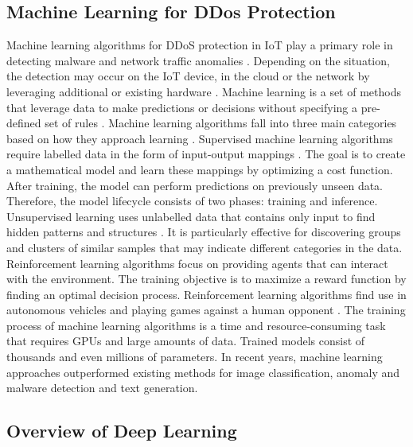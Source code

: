 \documentclass[conference, 11pt]{IEEEtran}
\begin{document}
    \subsection{Machine Learning for DDos Protection}
    Machine learning algorithms for DDoS protection in IoT play a primary role in detecting malware and network traffic anomalies \cite{article:18}.
    Depending on the situation, the detection may occur on the IoT device, in the cloud or the network by leveraging additional or existing hardware \cite{article:5}.
    Machine learning is a set of methods that leverage data to make predictions or decisions without specifying a pre-defined set of rules \cite{Goodfellow-et-al-2016}.
    Machine learning algorithms fall into three main categories based on how they approach learning \cite{article:6}.
    Supervised machine learning algorithms require labelled data in the form of input-output mappings \cite{Goodfellow-et-al-2016}.
    The goal is to create a mathematical model and learn these mappings by optimizing a cost function.
    After training, the model can perform predictions on previously unseen data.
    Therefore, the model lifecycle consists of two phases: training and inference.
    Unsupervised learning uses unlabelled data that contains only input to find hidden patterns and structures \cite{Goodfellow-et-al-2016}.
    It is particularly effective for discovering groups and clusters of similar samples that may indicate different categories in the data.
    Reinforcement learning algorithms focus on providing agents that can interact with the environment.
    The training objective is to maximize a reward function by finding an optimal decision process.
    Reinforcement learning algorithms find use in autonomous vehicles and playing games against a human opponent \cite{Goodfellow-et-al-2016}.
    The training process of machine learning algorithms is a time and resource-consuming task that requires GPUs and large amounts of data.
    Trained models consist of thousands and even millions of parameters.
    In recent years, machine learning approaches outperformed existing methods for image classification, anomaly and malware detection and text generation.

    \subsection{Overview of Deep Learning}
\end{document}
